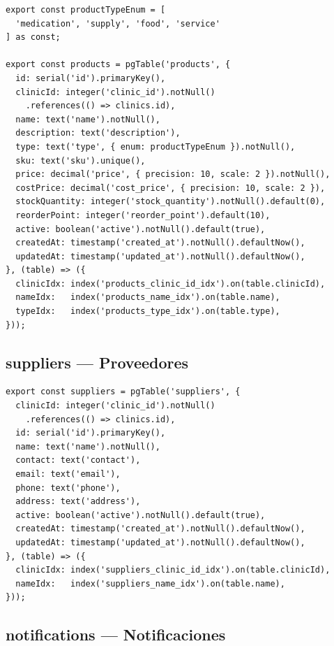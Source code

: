 \begin{lstlisting}[style=typescript, caption=Esquema products]
export const productTypeEnum = [
  'medication', 'supply', 'food', 'service'
] as const;

export const products = pgTable('products', {
  id: serial('id').primaryKey(),
  clinicId: integer('clinic_id').notNull()
    .references(() => clinics.id),
  name: text('name').notNull(),
  description: text('description'),
  type: text('type', { enum: productTypeEnum }).notNull(),
  sku: text('sku').unique(),
  price: decimal('price', { precision: 10, scale: 2 }).notNull(),
  costPrice: decimal('cost_price', { precision: 10, scale: 2 }),
  stockQuantity: integer('stock_quantity').notNull().default(0),
  reorderPoint: integer('reorder_point').default(10),
  active: boolean('active').notNull().default(true),
  createdAt: timestamp('created_at').notNull().defaultNow(),
  updatedAt: timestamp('updated_at').notNull().defaultNow(),
}, (table) => ({
  clinicIdx: index('products_clinic_id_idx').on(table.clinicId),
  nameIdx:   index('products_name_idx').on(table.name),
  typeIdx:   index('products_type_idx').on(table.type),
}));
\end{lstlisting}

\subsection{suppliers --- Proveedores}

\begin{lstlisting}[style=typescript, caption=Esquema suppliers]
export const suppliers = pgTable('suppliers', {
  clinicId: integer('clinic_id').notNull()
    .references(() => clinics.id),
  id: serial('id').primaryKey(),
  name: text('name').notNull(),
  contact: text('contact'),
  email: text('email'),
  phone: text('phone'),
  address: text('address'),
  active: boolean('active').notNull().default(true),
  createdAt: timestamp('created_at').notNull().defaultNow(),
  updatedAt: timestamp('updated_at').notNull().defaultNow(),
}, (table) => ({
  clinicIdx: index('suppliers_clinic_id_idx').on(table.clinicId),
  nameIdx:   index('suppliers_name_idx').on(table.name),
}));
\end{lstlisting}

\subsection{notifications --- Notificaciones}

